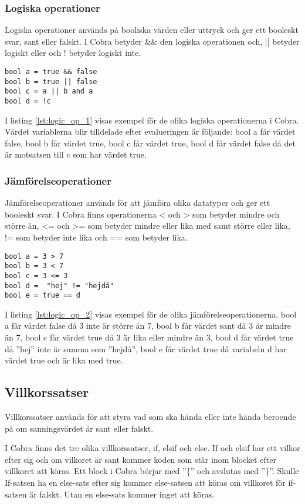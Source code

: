 \documentclass{TDP003mall}
\begin{document}
\subsubsection{Logiska operationer}
Logiska operationer används på booliska värden eller uttryck och ger ett booleskt svar, sant eller falskt. I Cobra betyder \&\&  den logiska operationen och, || betyder logiskt eller och ! betyder logiskt inte.
\begin{lstlisting}[caption=Logiska operationer-exempel, label=lst:logic_op_1]
bool a = true && false
bool b = true || false
bool c = a || b and a
bool d = !c
\end{lstlisting}
I listing \ref{lst:logic_op_1} visas exempel för de olika logiska operationerna i Cobra. Värdet variablerna blir tilldelade efter evalueringen är följande:
bool a får värdet false, 
bool b får värdet true, 
bool c får värdet true, 
bool d får värdet false då det är motsatsen till c som har värdet true. 

\subsubsection{Jämförelseoperationer}
Jämförelseoperationer används för att jämföra olika datatyper och ger ett booleskt svar. I Cobra finns operationerna < och > som betyder mindre och större än, <= och >= som betyder mindre eller lika med samt större eller lika, != som betyder inte lika och == som betyder lika.
\begin{lstlisting}[caption=Logiska operationer-exempel, label=lst:logic_op_2]
bool a = 3 > 7
bool b = 3 < 7
bool c = 3 <= 3
bool d =  "hej" != "hejdå"
bool e = true == d
\end{lstlisting}
I listing \ref{lst:logic_op_2} visas exempel för de olika jämförelseoperationerna. 
bool a får värdet false då 3 inte är större än 7, 
bool b får värdet sant då 3 är mindre än 7, 
bool c får värdet true då 3 är lika eller mindre än 3, 
bool d får värdet true då ''hej'' inte är samma som ''hejdå'', 
bool e får värdet true då variabeln d har värdet true och är lika med true.
\newpage
\subsection{Villkorssatser}
Villkorssatser används för att styra vad som ska hända eller inte hända beroende på om sanningsvärdet är sant eller falskt.

I Cobra finns det tre olika villkorssatser, if, elsif och else. 
If och elsif har ett vilkor efter sig och om vilkoret är sant kommer koden som står inom blocket efter villkoret att köras.
Ett block i Cobra börjar med ''\{'' och avslutas med ''\}''. 
Skulle If-satsen ha en else-sats efter sig kommer else-satsen att köras om villkoret för if-satsen är falskt.
Utan en else-sats kommer inget att köras.
\end{document}
